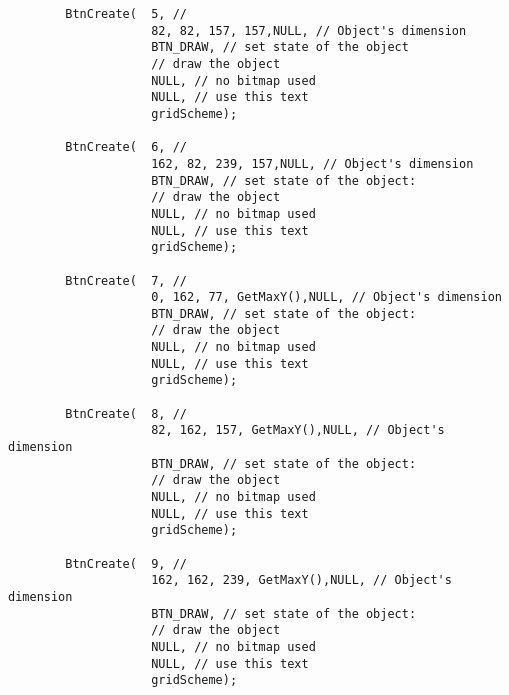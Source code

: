 \documentclass[12pt]{article}
\begin{document}
\begin{lstlisting}
        BtnCreate(  5, // 
                    82, 82, 157, 157,NULL, // Object's dimension
                    BTN_DRAW, // set state of the object
                    // draw the object
                    NULL, // no bitmap used
                    NULL, // use this text
                    gridScheme);

        BtnCreate(  6, // 
                    162, 82, 239, 157,NULL, // Object's dimension
                    BTN_DRAW, // set state of the object:
                    // draw the object
                    NULL, // no bitmap used
                    NULL, // use this text
                    gridScheme);

        BtnCreate(  7, // 
                    0, 162, 77, GetMaxY(),NULL, // Object's dimension
                    BTN_DRAW, // set state of the object:
                    // draw the object
                    NULL, // no bitmap used
                    NULL, // use this text
                    gridScheme);

        BtnCreate(  8, // 
                    82, 162, 157, GetMaxY(),NULL, // Object's dimension
                    BTN_DRAW, // set state of the object:
                    // draw the object
                    NULL, // no bitmap used
                    NULL, // use this text
                    gridScheme);

        BtnCreate(  9, //
                    162, 162, 239, GetMaxY(),NULL, // Object's dimension
                    BTN_DRAW, // set state of the object:
                    // draw the object
                    NULL, // no bitmap used
                    NULL, // use this text
                    gridScheme);
\end{lstlisting}
\end{document}
